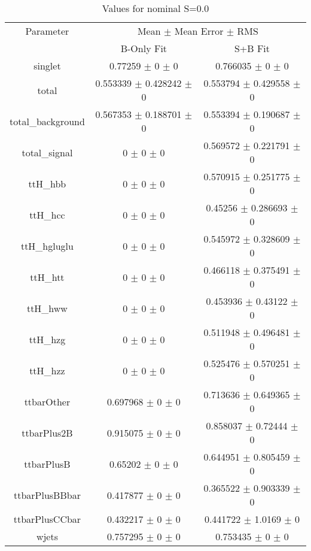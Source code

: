 \begin{table}
\centering
\caption{Values for nominal S=0.0}
\begin{tabular}{ccc}
\toprule
Parameter & \multicolumn{2}{c}{Mean $\pm$ Mean Error $\pm$ RMS}\\
 & B-Only Fit & S+B Fit\\
\midrule
singlet & \num{0.77259} $\pm$ \num{0} $\pm$ \num{0} & \num{0.766035} $\pm$ \num{0} $\pm$ \num{0}\\
total & \num{0.553339} $\pm$ \num{0.428242} $\pm$ \num{0} & \num{0.553794} $\pm$ \num{0.429558} $\pm$ \num{0}\\
total\_background & \num{0.567353} $\pm$ \num{0.188701} $\pm$ \num{0} & \num{0.553394} $\pm$ \num{0.190687} $\pm$ \num{0}\\
total\_signal & \num{0} $\pm$ \num{0} $\pm$ \num{0} & \num{0.569572} $\pm$ \num{0.221791} $\pm$ \num{0}\\
ttH\_hbb & \num{0} $\pm$ \num{0} $\pm$ \num{0} & \num{0.570915} $\pm$ \num{0.251775} $\pm$ \num{0}\\
ttH\_hcc & \num{0} $\pm$ \num{0} $\pm$ \num{0} & \num{0.45256} $\pm$ \num{0.286693} $\pm$ \num{0}\\
ttH\_hgluglu & \num{0} $\pm$ \num{0} $\pm$ \num{0} & \num{0.545972} $\pm$ \num{0.328609} $\pm$ \num{0}\\
ttH\_htt & \num{0} $\pm$ \num{0} $\pm$ \num{0} & \num{0.466118} $\pm$ \num{0.375491} $\pm$ \num{0}\\
ttH\_hww & \num{0} $\pm$ \num{0} $\pm$ \num{0} & \num{0.453936} $\pm$ \num{0.43122} $\pm$ \num{0}\\
ttH\_hzg & \num{0} $\pm$ \num{0} $\pm$ \num{0} & \num{0.511948} $\pm$ \num{0.496481} $\pm$ \num{0}\\
ttH\_hzz & \num{0} $\pm$ \num{0} $\pm$ \num{0} & \num{0.525476} $\pm$ \num{0.570251} $\pm$ \num{0}\\
ttbarOther & \num{0.697968} $\pm$ \num{0} $\pm$ \num{0} & \num{0.713636} $\pm$ \num{0.649365} $\pm$ \num{0}\\
ttbarPlus2B & \num{0.915075} $\pm$ \num{0} $\pm$ \num{0} & \num{0.858037} $\pm$ \num{0.72444} $\pm$ \num{0}\\
ttbarPlusB & \num{0.65202} $\pm$ \num{0} $\pm$ \num{0} & \num{0.644951} $\pm$ \num{0.805459} $\pm$ \num{0}\\
ttbarPlusBBbar & \num{0.417877} $\pm$ \num{0} $\pm$ \num{0} & \num{0.365522} $\pm$ \num{0.903339} $\pm$ \num{0}\\
ttbarPlusCCbar & \num{0.432217} $\pm$ \num{0} $\pm$ \num{0} & \num{0.441722} $\pm$ \num{1.0169} $\pm$ \num{0}\\
wjets & \num{0.757295} $\pm$ \num{0} $\pm$ \num{0} & \num{0.753435} $\pm$ \num{0} $\pm$ \num{0}\\
\bottomrule
\end{tabular}
\end{table}